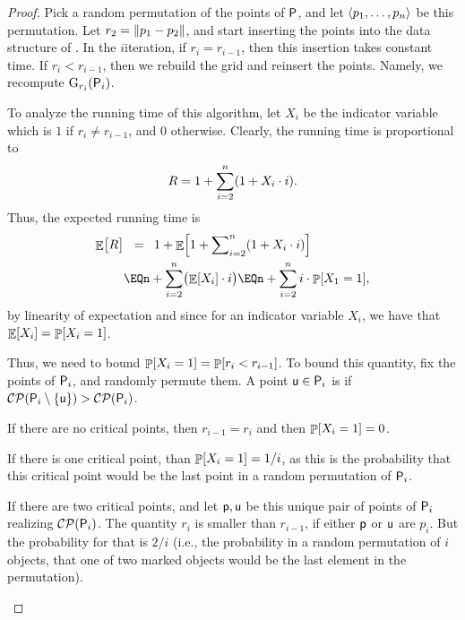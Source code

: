 \begin{proof}
    Pick a random permutation of the points of ${\mathsf{P}}$, and let
    $\left\langle {p_1,\ldots, p_n} \right\rangle$ be this permutation. Let
    $r_2= \left\| {p_1 - p_2} \right\|$, and start inserting the points into the
    data structure of . In the $i$\th iteration, if
    $r_{i} =r_{i-1}$, then this insertion takes constant time. If
    $r_{i} < r_{i-1}$, then we rebuild the grid and reinsert the
    points.  Namely, we recompute $\Grid_{r_i}\pth{\PntSet_i}$.

    To analyze the running time of this algorithm, let $X_i$ be the
    indicator variable which is $1$ if $r_i \ne r_{i-1}$, and $0$
    otherwise. Clearly, the running time is proportional to 
    \[
    R = 
    1 + \sum_{i=2}^n \pth{1 + X_i \cdot i}.
    \]
    Thus, the expected running time is
    \begin{align*}
        \Ex{ \bigl. R} %
        &\EQ%
        1 +
        \Ex{1 + \sum\nolimits_{i=2}^n \pth{1 + X_i \cdot i}}
        \\&
        \EQ%
        n + \sum_{i=2}^n \bigl( \Ex{X_i} \cdot i \bigr)
        \EQ%
        n + \sum_{i=2}^n i \cdot \Prob{X_1 = 1},
    \end{align*}
    by linearity of expectation and since for an indicator variable
    $X_i$, we have that $\Ex{X_i} = \Prob{X_i = 1}$.

    
    Thus, we need to bound $\Prob{ X_i=1} = \Prob{r_i < r_{i-1}}$. To
    bound this quantity, fix the points of ${\mathsf{P}}_i$, and randomly
    permute them. A point $\mathsf{u} \in {\mathsf{P}}_i$ is  if
    $\ClosestPair\pth{ \PntSet_i \setminus \brc{\pntA}} >
    \ClosestPair\pth{\PntSet_i}$.
    \begin{compactenumA}
        \item If there are no critical points, then $r_{i-1} = r_i$
        and then $\Prob{X_i=1}= 0$.

        \smallskip%
        \item If there is one critical point, than $\Prob{X_i=1}=1/i$,
        as this is the probability that this critical point would be
        the last point in a random permutation of ${\mathsf{P}}_i$.

        \smallskip%
        \item If there are two critical points, and let $\mathsf{p},\mathsf{u}$
        be this unique pair of points of ${\mathsf{P}}_i$ realizing
        $\ClosestPair\pth{\PntSet_i}$. The quantity $r_i$ is smaller
        than $r_{i-1}$, if either $\mathsf{p}$ or $\mathsf{u}$ are $p_i$. But the
        probability for that is $2/i$ (i.e., the probability in a
        random permutation of $i$ objects, that one of two marked
        objects would be the last element in the permutation).


\end{compactenumA}
\end{proof}
